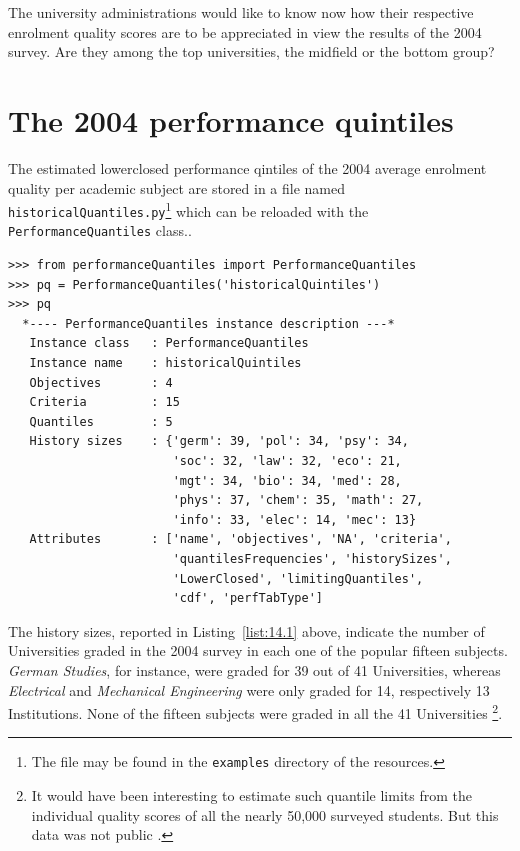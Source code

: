 The university administrations would like to know now how their respective enrolment quality scores are to be appreciated in view the results of the 2004 \Spiegel survey. Are they among the top universities, the midfield or the bottom group?

\section{The 2004 performance quintiles}
\label{sec:14.2}

The estimated lowerclosed performance qintiles of the 2004 average enrolment quality per academic subject are stored in a file named \texttt{historicalQuantiles.py}\footnote{The file may be found in the \texttt{examples} directory of the \Digraph resources.} which can be reloaded with the \texttt{PerformanceQuantiles} class..
\begin{lstlisting}[caption={},label=list:14.1]
>>> from performanceQuantiles import PerformanceQuantiles
>>> pq = PerformanceQuantiles('historicalQuintiles')
>>> pq
  *---- PerformanceQuantiles instance description ---*
   Instance class   : PerformanceQuantiles
   Instance name    : historicalQuintiles
   Objectives       : 4
   Criteria         : 15
   Quantiles        : 5
   History sizes    : {'germ': 39, 'pol': 34, 'psy': 34,
                       'soc': 32, 'law': 32, 'eco': 21,
                       'mgt': 34, 'bio': 34, 'med': 28,
                       'phys': 37, 'chem': 35, 'math': 27,
                       'info': 33, 'elec': 14, 'mec': 13}
   Attributes       : ['name', 'objectives', 'NA', 'criteria',
                       'quantilesFrequencies', 'historySizes',
                       'LowerClosed', 'limitingQuantiles',
                       'cdf', 'perfTabType']
\end{lstlisting}

The history sizes, reported in Listing~\vref{list:14.1} above, indicate the number of Universities graded in the 2004 survey in each one of the popular fifteen subjects. \emph{German Studies}, for instance, were graded for 39 out of 41 Universities, whereas \emph{Electrical} and \emph{Mechanical Engineering} were only graded for 14, respectively 13 Institutions. None of the fifteen subjects were graded in all the 41 Universities \footnote{It would have been interesting to estimate such quantile limits from the individual quality scores of all the nearly 50,000 surveyed students. But this data was not public \citep{SPI-2004}.}.                      

